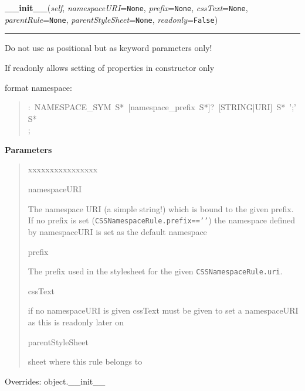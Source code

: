 \hspace{.8\funcindent}\begin{boxedminipage}{\funcwidth}

    \raggedright \textbf{\_\_init\_\_}(\textit{self}, \textit{namespaceURI}={\tt None}, \textit{prefix}={\tt None}, \textit{cssText}={\tt None}, \textit{parentRule}={\tt None}, \textit{parentStyleSheet}={\tt None}, \textit{readonly}={\tt False})

    \vspace{-1.5ex}

    \rule{\textwidth}{0.5\fboxrule}
\setlength{\parskip}{2ex}

Do not use as positional but as keyword parameters only!

If readonly allows setting of properties in constructor only

format namespace:
\begin{quote}{\ttfamily \raggedright \noindent
:~NAMESPACE{\_}SYM~S*~{[}namespace{\_}prefix~S*{]}?~{[}STRING|URI{]}~S*~';'~S*~\\
;
}\end{quote}
\setlength{\parskip}{1ex}
      \textbf{Parameters}
      \vspace{-1ex}

      \begin{quote}
        \begin{Ventry}{xxxxxxxxxxxxxxxx}

          \item[namespaceURI]


The namespace URI (a simple string!) which is bound to the
given prefix. If no prefix is set
(\texttt{CSSNamespaceRule.prefix=='{}'}) the namespace defined by
namespaceURI is set as the default namespace
          \item[prefix]


The prefix used in the stylesheet for the given
\texttt{CSSNamespaceRule.uri}.
          \item[cssText]


if no namespaceURI is given cssText must be given to set
a namespaceURI as this is readonly later on
          \item[parentStyleSheet]


sheet where this rule belongs to
        \end{Ventry}

      \end{quote}

      Overrides: object.\_\_init\_\_

    \end{boxedminipage}

